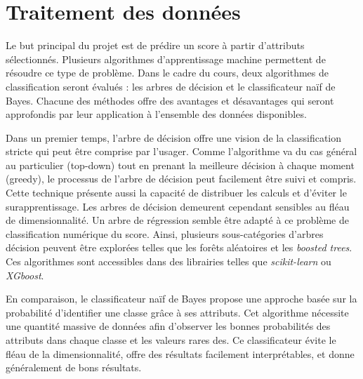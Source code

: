 \documentclass[french]{article}
\begin{document}
\section{Traitement des données}

Le but principal du projet est de prédire un score à partir d'attributs sélectionnés. Plusieurs algorithmes d'apprentissage machine permettent de résoudre ce type de problème. Dans le cadre du cours, deux algorithmes de classification seront évalués : les arbres de décision et le classificateur naïf de Bayes. Chacune des méthodes offre des avantages et désavantages qui seront approfondis par leur application à l'ensemble des données disponibles.

Dans un premier temps, l'arbre de décision offre une vision de la classification stricte qui peut être comprise par l'usager.  Comme l'algorithme va du cas général au particulier (top-down) tout en prenant la meilleure décision à chaque moment (greedy), le processus de l'arbre de décision peut facilement être suivi et compris. Cette technique présente aussi la capacité de distribuer les calculs et d'éviter le surapprentissage. Les arbres de décision demeurent cependant sensibles au fléau de dimensionnalité. Un arbre de régression semble être adapté à ce problème de classification numérique du score. Ainsi, plusieurs sous-catégories d'arbres décision peuvent être explorées telles que les forêts aléatoires et les \emph{boosted trees}. Ces algorithmes sont accessibles dans des librairies telles que \emph{scikit-learn} ou \emph{XGboost}.

En comparaison, le classificateur naïf de Bayes propose une approche basée sur la probabilité d'identifier une classe grâce à ses attributs. Cet algorithme nécessite une quantité massive de données afin d'observer les bonnes probabilités des attributs dans chaque classe et les valeurs rares des. Ce classificateur évite le fléau de la dimensionnalité, offre des résultats facilement interprétables, et donne généralement de bons résultats.
\end{document}
